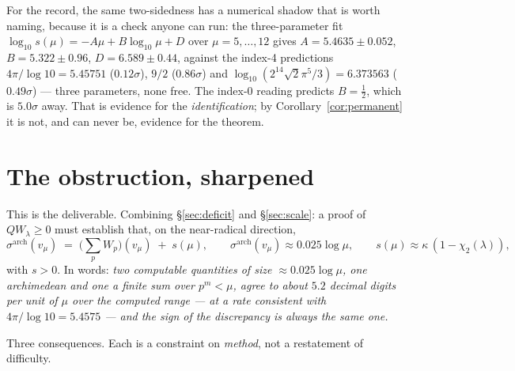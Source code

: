 \documentclass[11pt,a4paper]{article}
\theoremstyle{plain}
\theoremstyle{definition}
\theoremstyle{remark}
\newcommand{\R}{\mathbb{R}}
\newcommand{\Z}{\mathbb{Z}}
\newcommand{\Q}{\mathbb{Q}}
\newcommand{\A}{\mathbb{A}}
\newcommand{\E}{\mathcal{E}}
\newcommand{\F}{\mathcal{F}}
\newcommand{\QW}{QW}
\def\QW{QW}\def\E{E}\def\F{F}\def\R{R}\def\Q{Q}\def\Z{Z}\def\A{A}%
\begin{document}
For the record, the same two-sidedness has a numerical shadow that is worth
naming, because it is a check anyone can run: the three-parameter fit
$\log_{10}s(\mu)=-A\mu+B\log_{10}\mu+D$ over $\mu=5,\dots,12$ gives
$A=5.4635\pm0.052$, $B=5.322\pm0.96$, $D=6.589\pm0.44$, against the index-4
predictions $4\pi/\log10=5.45751$ ($0.12\sigma$), $9/2$ ($0.86\sigma$) and
$\log_{10}(2^{14}\sqrt2\pi^5/3)=6.373563$ ($0.49\sigma$) --- three parameters,
none free.  The index-0 reading predicts $B=\tfrac12$, which is $5.0\sigma$ away.
That is evidence for the \emph{identification}; by Corollary~\ref{cor:permanent}
it is not, and can never be, evidence for the theorem.

\section{The obstruction, sharpened}
\label{sec:sharpening}

This is the deliverable.  Combining \S\ref{sec:deficit} and \S\ref{sec:scale}: a
proof of $\QW_\lambda\ge0$ must establish that, on the near-radical direction,
\[
  \sigma^{\mathrm{arch}}(v_\mu)\;=\;\Big(\sum_pW_p\Big)(v_\mu)\;+\;s(\mu),
  \qquad
  \sigma^{\mathrm{arch}}(v_\mu)\approx0.025\log\mu,
  \qquad
  s(\mu)\approx\kappa\,(1-\chi_2(\lambda)),
\]
with $s>0$.  In words: \emph{two computable quantities of size
$\approx0.025\log\mu$, one archimedean and one a finite sum over $p^m<\mu$,
agree to about $5.2$ decimal digits per unit of $\mu$ over the computed range ---
at a rate consistent with $4\pi/\log10=5.4575$ --- and the sign of the
discrepancy is always the same one.}

Three consequences.  Each is a constraint on \emph{method}, not a restatement of
difficulty.
\end{document}
